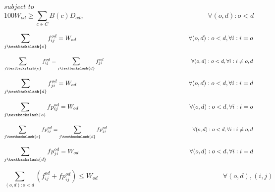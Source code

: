 $subject$ $to$
\begin{equation}
100 W_{od} \geq \sum_{c\in C} B\left(c\right) D_{odc} \qquad \qquad \qquad \qquad \qquad \qquad \qquad \qquad \qquad
\forall(o,d) : o < d
\label{ILPTransp0}
\end{equation}

\begin{equation}
\sum_{j\textbackslash \{o\}} f_{ij}^{od} = W_{od}  \qquad \qquad \qquad \qquad \qquad \qquad \qquad \qquad \qquad
\forall(o,d) : o < d, \forall i: i = o
\label{ILPTransp1}
\end{equation}

\begin{equation}
\sum_{j\textbackslash \{o\}} f_{ij}^{od} = \sum_{j\textbackslash \{d\}} f_{ji}^{od} \qquad \qquad \qquad \qquad \qquad \qquad \qquad \qquad
\forall(o,d) : o < d, \forall i: i \neq o,d
\label{ILPTransp2}
\end{equation}

\begin{equation}
\sum_{j\textbackslash \{d\}} f_{ji}^{od} = W_{od}  \qquad \qquad \qquad \qquad \qquad \qquad \qquad \qquad \qquad
\forall(o,d) : o < d, \forall i: i = d
\label{ILPTransp3}
\end{equation}

\begin{equation}
\sum_{j\textbackslash \{o\}} fp_{ij}^{od} = W_{od} \qquad \qquad \qquad \qquad \qquad \qquad \qquad \qquad \qquad
\forall(o,d) : o < d, \forall i: i = o
\label{ILPTransp1p}
\end{equation}

\begin{equation}
\sum_{j\textbackslash \{o\}} fp_{ij}^{od} = \sum_{j\textbackslash \{d\}} fp_{ji}^{od} \qquad \qquad \qquad \qquad \qquad \qquad \qquad \qquad
\forall(o,d) : o < d, \forall i: i \neq o,d
\label{ILPTransp2p}
\end{equation}

\begin{equation}
\sum_{j\textbackslash \{d\}} fp_{ji}^{od} = W_{od} \qquad \qquad \qquad \qquad \qquad \qquad \qquad \qquad \qquad
\forall(o,d) : o < d, \forall i: i = d
\label{ILPTransp3p}
\end{equation}

\begin{equation}
\sum_{(o,d):o<d} \left(f_{ij}^{od}  + fp_{ij}^{od}\right) \leq W_{od}  \qquad \qquad \qquad \qquad \qquad \qquad \qquad \qquad \qquad
\forall (o,d), (i,j)
\label{ILPTransp4p}
\end{equation}

